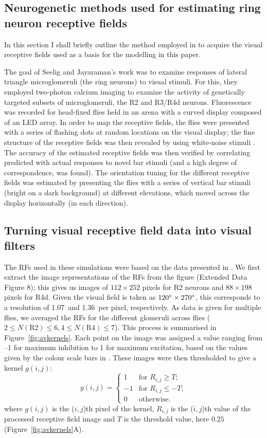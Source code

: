 \documentclass[10pt]{article}
\begin{document}
\subsection*{Neurogenetic methods used for estimating ring neuron receptive fields}
\label{sec:methods:seelig}
In this section I shall briefly outline the method employed in \cite{Seelig2013} to acquire the visual receptive fields used as a basis for the modelling in this paper.

The goal of Seelig and Jayaraman's \cite{Seelig2013} work was to examine responses of lateral triangle microglomeruli (the ring neurons) to visual stimuli.
For this, they employed two-photon calcium imaging to examine the activity of genetically targeted subsets of microglomeruli, the R2 and R3/R4d neurons.
Fluorescence was recorded for head-fixed flies held in an arena with a curved display composed of an LED array.
In order to map the receptive fields, the flies were presented with a series of flashing dots at random locations on the visual display; the fine structure of the receptive fields was then revealed by using white-noise stimuli \cite{Weber2010}.
The accuracy of the estimated receptive fields was then verified by correlating predicted with actual responses to novel bar stimuli (and a high degree of correspondence, was found).
The orientation tuning for the different receptive fields was estimated by presenting the flies with a series of vertical bar stimuli (bright on a dark background) at different elevations, which moved across the display horizontally (in each direction).

\subsection*{Turning visual receptive field data into visual filters}
\label{sec:methods:preprocessing}
The RFs used in these simulations were based on the data presented in \cite{Seelig2013}.
We first extract the image representations of the RFs from the figure (Extended Data Figure 8); this gives us images of $112\times 252$ pixels for R2 neurons and $88\times 198$ pixels for R4d.
Given the visual field is taken as $120\degree\times 270\degree$, this corresponds to a resolution of 1.07\degree\ and 1.36\degree\ per pixel, respectively.
As data is given for multiple flies, we averaged the RFs for the different glomeruli across flies ($2\le N(\mathrm{R2}) \le 6, 4\le N(\mathrm{R4})\le 7$). This process is summarised in Figure~\ref{fig:avkernels}. Each point on the image was assigned a value ranging from --1 for maximum inhibition to 1 for maximum excitation, based on the values given by the colour scale bars in \cite{Seelig2013}.
These images were then thresholded to give a kernel $g(i,j)$:
$$
g(i,j) = \left\{ \begin{array}{rl}
1 & \mbox{for } R_{i,j} \ge T; \\
-1 & \mbox{for } R_{i,j} \le -T; \\
0 & \mbox{otherwise.}
\end{array}
\right.
$$
where $g(i,j)$ is the ($i,j$)th pixel of the kernel, $R_{i,j}$ is the ($i,j$)th value of the processed receptive field image and $T$ is the threshold value, here $0.25$ (Figure~\ref{fig:avkernels}A).
\end{document}

